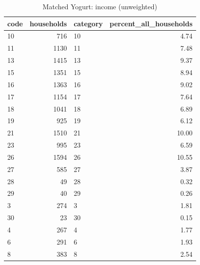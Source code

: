 \begin{table}
\caption{Matched Yogurt: income (unweighted)}
\begin{tabular}{lrlr}
\toprule
code & households & category & percent\_all\_households \\
\midrule
10 & 716 & 10 & 4.74 \\
11 & 1130 & 11 & 7.48 \\
13 & 1415 & 13 & 9.37 \\
15 & 1351 & 15 & 8.94 \\
16 & 1363 & 16 & 9.02 \\
17 & 1154 & 17 & 7.64 \\
18 & 1041 & 18 & 6.89 \\
19 & 925 & 19 & 6.12 \\
21 & 1510 & 21 & 10.00 \\
23 & 995 & 23 & 6.59 \\
26 & 1594 & 26 & 10.55 \\
27 & 585 & 27 & 3.87 \\
28 & 49 & 28 & 0.32 \\
29 & 40 & 29 & 0.26 \\
3 & 274 & 3 & 1.81 \\
30 & 23 & 30 & 0.15 \\
4 & 267 & 4 & 1.77 \\
6 & 291 & 6 & 1.93 \\
8 & 383 & 8 & 2.54 \\
\bottomrule
\end{tabular}
\end{table}
